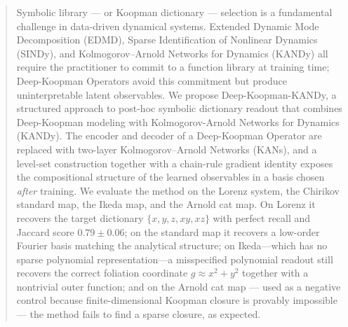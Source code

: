 \documentclass{article}
\begin{document}
\begin{abstract}
Symbolic library --- or Koopman dictionary --- selection is a fundamental challenge in data-driven dynamical systems. Extended Dynamic Mode Decomposition (EDMD), Sparse Identification of Nonlinear Dynamics (SINDy), and Kolmogorov--Arnold Networks for Dynamics (KANDy) all require the practitioner to commit to a function library at training time; Deep-Koopman Operators avoid this commitment but produce uninterpretable latent observables. We propose Deep-Koopman-KANDy, a structured approach to post-hoc symbolic dictionary readout that combines Deep-Koopman modeling with Kolmogorov-Arnold Networks for Dynamics (KANDy). The encoder and decoder of a Deep-Koopman Operator are replaced with two-layer Kolmogorov--Arnold Networks (KANs), and a level-set construction together with a chain-rule gradient identity exposes the compositional structure of the learned observables in a basis chosen \emph{after} training. We evaluate the method on the Lorenz system, the Chirikov standard map, the Ikeda map, and the Arnold cat map. On Lorenz it recovers the target dictionary $\{x,y,z,xy,xz\}$ with perfect recall and Jaccard score $0.79\pm0.06$; on the standard map it recovers a low-order Fourier basis matching the analytical structure; on Ikeda---which has no sparse polynomial representation---a misspecified polynomial readout still recovers the correct foliation coordinate $g\approx x^2+y^2$ together with a nontrivial outer function; and on the Arnold cat map --- used as a negative control because finite-dimensional Koopman closure is provably impossible --- the method fails to find a sparse closure, as expected.
\end{abstract}
\end{document}
